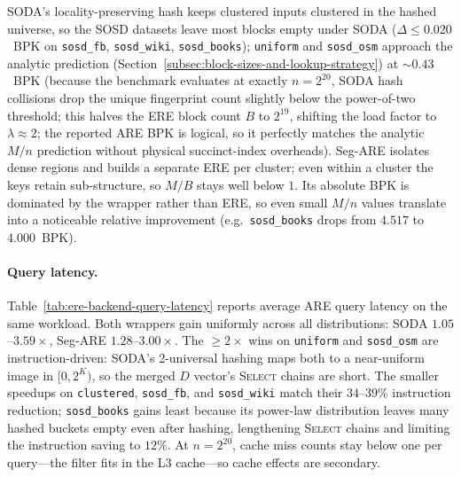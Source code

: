 SODA's locality-preserving hash keeps clustered inputs clustered in the
hashed universe, so the SOSD datasets leave most blocks empty under
SODA ($\Delta \le 0.020$~BPK on \texttt{sosd\_fb}, \texttt{sosd\_wiki},
\texttt{sosd\_books}); \texttt{uniform} and \texttt{sosd\_osm} approach the analytic prediction
(Section~\ref{subsec:block-sizes-and-lookup-strategy}) at ${\sim}0.43$~BPK
(because the benchmark evaluates at exactly $n = 2^{20}$,
SODA hash collisions drop the unique fingerprint count slightly below the power-of-two threshold;
this halves the ERE block count $B$ to $2^{19}$, shifting the load factor to $\lambda \approx 2$;
the reported ARE BPK is logical, so it perfectly matches the analytic $M/n$ prediction without physical succinct-index overheads).
Seg-ARE isolates dense regions and
builds a separate ERE per cluster; even within a cluster the keys
retain sub-structure, so $M/B$ stays well below $1$. Its absolute BPK
is dominated by the wrapper rather than ERE, so even small $M/n$
values translate into a noticeable relative improvement (e.g.\
\texttt{sosd\_books} drops from $4.517$ to $4.000$~BPK).

\paragraph{Query latency.}
Table~\ref{tab:ere-backend-query-latency} reports average ARE query
latency on the same workload. Both wrappers gain uniformly across all
distributions: SODA $1.05$--$3.59\times$, Seg-ARE $1.28$--$3.00\times$.
The $\geq 2\times$ wins on \texttt{uniform} and \texttt{sosd\_osm} are
instruction-driven: SODA's
2-universal hashing maps both to a near-uniform image in $[0, 2^K)$,
so the merged $D$ vector's \textsc{Select} chains are short. The smaller speedups on
\texttt{clustered}, \texttt{sosd\_fb}, and \texttt{sosd\_wiki} match
their $34$--$39\%$ instruction reduction; \texttt{sosd\_books} gains
least because its power-law distribution leaves many hashed buckets
empty even after hashing, lengthening \textsc{Select} chains and
limiting the instruction saving to $12\%$. At $n = 2^{20}$, cache miss
counts stay below one per query---the filter fits in the L3 cache---so
cache effects are secondary.

